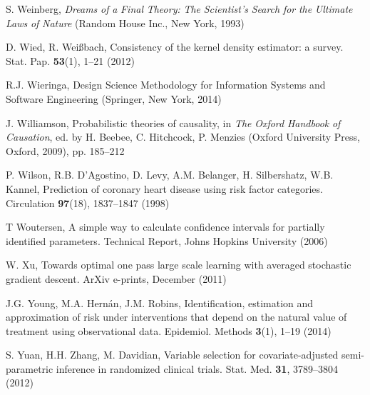 \begin{list}{}{\setlength{\leftmargin}{2.1em}\setlength{\labelwidth}{0pt}
  \setlength{\labelsep}{0pt}\setlength{\itemindent}{-2.1em}
  \setlength{\parsep}{0pt}\setlength{\itemsep}{2pt}\setlength{\topsep}{0pt}}
\item\label{refentry:REF470}S. Weinberg, \textit{Dreams} \textit{of} \textit{a} \textit{Final} \textit{Theory:} \textit{The} \textit{Scientist's} \textit{Search} \textit{for} \textit{the} \textit{Ultimate} \textit{Laws} \textit{of} \textit{Nature} (Random House Inc., New York, 1993)\label{refend:REF470}
\item\label{refentry:REF471}D. Wied, R. Weißbach, Consistency of the kernel density estimator: a survey. Stat. Pap. \textbf{53}(1), 1--21 (2012)\label{refend:REF471}
\item\label{refentry:REF472}R.J. Wieringa, Design Science Methodology for Information Systems and Software Engineering (Springer, New York, 2014)\label{refend:REF472}
\item\label{refentry:REF473}J. Williamson, Probabilistic theories of causality, in \textit{The} \textit{Oxford} \textit{Handbook} \textit{of} \textit{Causation}, ed. by H. Beebee, C. Hitchcock, P. Menzies (Oxford University Press, Oxford, 2009), pp. 185--212\label{refend:REF473}
\item\label{refentry:REF474}P. Wilson, R.B. D'Agostino, D. Levy, A.M. Belanger, H. Silbershatz, W.B. Kannel, Prediction of coronary heart disease using risk factor categories. Circulation \textbf{97}(18), 1837--1847 (1998)\label{refend:REF474}
\item\label{refentry:REF475}T Woutersen, A simple way to calculate confidence intervals for partially identified parameters. Technical Report, Johns Hopkins University (2006)\label{refend:REF475}
\item\label{refentry:REF476}W. Xu, Towards optimal one pass large scale learning with averaged stochastic gradient descent. ArXiv e-prints, December (2011)\label{refend:REF476}
\item\label{refentry:REF477}J.G. Young, M.A. Hernán, J.M. Robins, Identification, estimation and approximation of risk under interventions that depend on the natural value of treatment using observational data. Epidemiol. Methods \textbf{3}(1), 1--19 (2014)\label{refend:REF477}
\item\label{refentry:REF478}S. Yuan, H.H. Zhang, M. Davidian, Variable selection for covariate-adjusted semi-parametric inference in randomized clinical trials. Stat. Med. \textbf{31}, 3789--3804 (2012)\label{refend:REF478}

\end{list}
